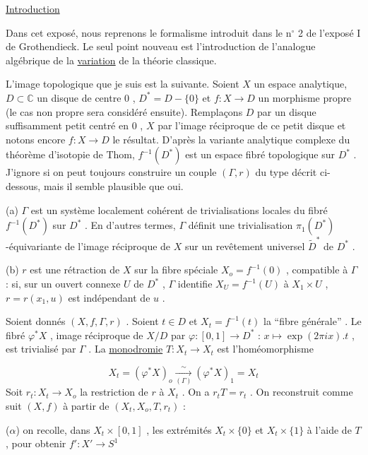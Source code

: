 


\underline{Introduction}

Dans cet exposé, nous reprenons le formalisme introduit dans le n$^\circ$ 2 de l'exposé I de Grothendieck. Le seul point nouveau est l'introduction de l'analogue algébrique de la \underline{variation} de la théorie classique.

L'image topologique que je suis est la suivante. Soient $X$ un espace analytique, $D \subset \mathbb{C}$ un disque de centre $0$ , $D^* = D - \{0\}$ et $f : X \to D$ un morphisme propre (le cas non propre sera considéré ensuite). Remplaçons $D$ par un disque suffisamment petit centré en $0$ , $X$ par l'image réciproque de ce petit disque et notons encore $f : X \to D$ le résultat. D'après la variante analytique complexe du théorème d'isotopie de Thom, $f^{-1}(D^*)$ est un espace fibré topologique sur $D^*$ . J'ignore si on peut toujours construire un couple $(\Gamma, r)$ du type décrit ci-dessous, mais il semble plausible que oui.

(a) $\Gamma$ est un système localement cohérent de trivialisations locales du fibré $f^{-1}(D^*)$ sur $D^*$ . En d'autres termes, $\Gamma$ définit une trivialisation $\pi_1(D^*)$-équivariante de l'image réciproque de $X$ sur un revêtement universel $\widetilde{D}^*$ de $D^*$ .

(b) $r$ est une rétraction de $X$ sur la fibre spéciale $X_o = f^{-1}(0)$ , compatible à $\Gamma$ : si, sur un ouvert connexe $U$ de $D^*$ , $\Gamma$ identifie $X_U = f^{-1}(U)$ à $X_1 \times U$ , $r = r(x_1, u)$ est indépendant de $u$ .

Soient donnés $(X, f, \Gamma , r)$ . Soient $t \in D$ et $X_t = f^{-1}(t)$ la ``fibre générale'' . Le fibré $\varphi^* X$ , image réciproque de $X/D$ par $\varphi : [0, 1] \to D^*$ : $x \longmapsto \exp(2 \pi i x).t$ , est trivialisé par $\Gamma$ . La \underline{monodromie} $T : X_t \longrightarrow X_t$ est l'homéomorphisme

\begin{equation*}
X_t = (\varphi^* X)_o \xrightarrow[(\Gamma)]{\sim} (\varphi^* X)_1 = X_t
\end{equation*}
Soit $r_t : X_t \longrightarrow X_o$ la restriction de $r$ à $X_t$ . On a $r_t T = r_t$ . On reconstruit comme suit $(X, f)$ à partir de $(X_t, X_o, T, r_t)$ :

($\alpha$) on recolle, dans $X_t \times [0, 1]$ , les extrémités $X_t \times \{0\}$ et $X_t \times \{1\}$ à l'aide de $T$ , pour obtenir $f' : X' \longrightarrow S^1$

